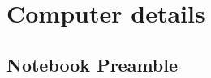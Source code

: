 \documentclass[../thesis.tex]{subfiles}
\begin{document}
\chapter{Computer details}


\section{Notebook Preamble}

\inputminted{julia}{notebooks/notebook_preamble.jl}
\end{document}
